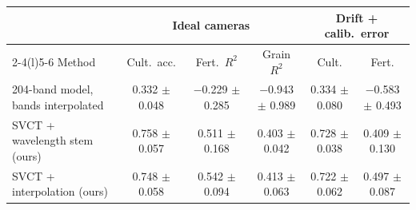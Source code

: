 \begin{tabular}{@{}lccccc@{}}
\toprule
 & \multicolumn{3}{c}{Ideal cameras} & \multicolumn{2}{c}{Drift + calib.\ error} \\
\cmidrule(lr){2-4}\cmidrule(l){5-6}
Method & Cult.\ acc. & Fert.\ $R^2$ & Grain $R^2$ & Cult. & Fert. \\
\midrule
204-band model, bands interpolated & 0.332 $\pm$ 0.048 & $-$0.229 $\pm$ 0.285 & $-$0.943 $\pm$ 0.989 & 0.334 $\pm$ 0.080 & $-$0.583 $\pm$ 0.493 \\
SVCT + wavelength stem (ours) & 0.758 $\pm$ 0.057 & 0.511 $\pm$ 0.168 & 0.403 $\pm$ 0.042 & 0.728 $\pm$ 0.038 & 0.409 $\pm$ 0.130 \\
SVCT + interpolation (ours) & 0.748 $\pm$ 0.058 & 0.542 $\pm$ 0.094 & 0.413 $\pm$ 0.063 & 0.722 $\pm$ 0.062 & 0.497 $\pm$ 0.087 \\
\bottomrule
\end{tabular}

